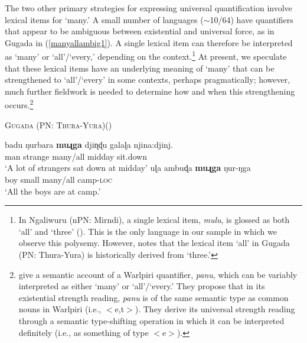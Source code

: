 \documentclass[12pt,egregdoesnotlikesansseriftitles]{scrartcl}
\begin{document}
The two other primary strategies for expressing universal quantification  involve lexical items for `many.' A small number of languages ($\sim$10/64) have quantifiers that appear to be ambiguous between existential and universal force, as in Gugada \textit{} in  (\ref{manyallambig1}). A single lexical item can therefore be interpreted as `many' or `all'/`every,' depending on the context.\footnote{In Ngaliwuru (nPN: Mirndi), a single lexical item, \textit{mulu}, is glossed as both `all' and `three' (\citealt[77]{boltetal71}). This is the only language in our sample in which we observe this polysemy. However, \cite{platt72} notes that the lexical item \textit{{}} `all' in Gugada (PN: Thura-Yura) is historically derived from `three.'} At present, we speculate that these lexical items have an underlying meaning of `many' that can be strengthened to `all'/`every' in some contexts, perhaps pragmatically; however, much further fieldwork is needed to determine how and when this strengthening occurs.\footnote{\cite{bittnerhale95} give a semantic account of a Warlpiri quantifier, \textit{panu}, which can be variably interpreted as either `many' or `all'/`every.' They propose that in its existential strength reading, \textit{panu} is of the same semantic type as common nouns in Warlpiri (i.e., $<$e,t$>$). They derive its universal strength reading through a semantic type-shifting operation in which it can be interpreted definitely (i.e., as something of type $<$e$>$).} %

\begin{exe}
  \ex  \textsc{Gugada (PN: Thura-Yura)}\hfill (\citealt[56-65]{platt72}) \label{manyallambig1}
  \begin{xlist}
    \ex \gll badu ŋurbara \textbf{muɻga} {djiɳɖu galaɭa} njina:djinj. \\ 
    man  strange  many/all  midday         sit.down\\
    \glt `A lot of strangers sat down at midday'
    \ex \gll uɭa ambuɖa \textbf{muɻga} ŋur-ŋga  \\
    boy   small    many/all      camp-\textsc{loc}\\
    \glt        `All the boys are at camp.'%
  \end{xlist}
 \end{exe}
 
\end{document}
